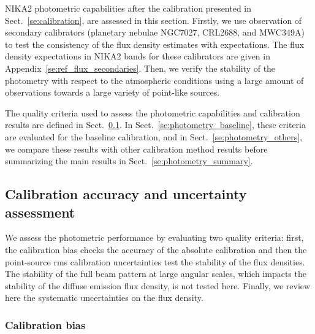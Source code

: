 %

NIKA2 photometric capabilities after the calibration presented in
Sect.~\ref{se:calibration}, are assessed in this section. Firstly,
we use observation of secondary calibrators (planetary nebulae NGC7027, CRL2688, and
MWC349A) to test the consistency of the flux density estimates with
expectations. The flux density expectations
in NIKA2 bands for these calibrators are given in
Appendix~\ref{se:ref_flux_secondaries}. Then,
we verify the stability of the photometry with
respect to the atmospheric conditions using a large amount of
observations towards a large variety of {\rev point-like}
sources. 

The quality criteria used to assess the photometric capabilities and
calibration results are defined in Sect.~\ref{se:photometry_criteria}.
In Sect.~\ref{se:photometry_baseline}, these criteria are evaluated
for the baseline calibration, and in Sect.~\ref{se:photometry_others},
we compare these results with other calibration method results before
summarizing the main results in Sect.~\ref{se:photometry_summary}. 


\subsection{Calibration accuracy and uncertainty assessment}
\label{se:photometry_criteria}

We assess the photometric performance by evaluating two
quality criteria: first, the calibration bias checks the accuracy of
the absolute calibration and then the {\rev point-source} rms
calibration uncertainties test the stability of the flux
densities. {\rev The stability of the full beam pattern at large
angular scales, which impacts the stability of the diffuse emission
flux density, is not tested here}. {\lp Finally, we review here the
systematic uncertainties on the flux density.}


\subsubsection{Calibration bias}
\label{se:def_calibration_bias}

